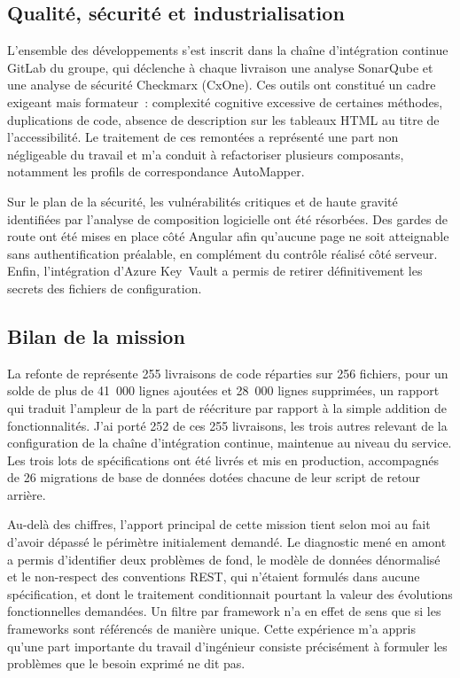 \subsection{Qualité, sécurité et industrialisation}
\label{sec:qualite}

L'ensemble des développements s'est inscrit dans la chaîne d'intégration
continue GitLab du groupe, qui déclenche à chaque livraison une analyse
SonarQube et une analyse de sécurité Checkmarx (CxOne). Ces outils ont
constitué un cadre exigeant mais formateur~: complexité cognitive excessive de
certaines méthodes, duplications de code, absence de description sur les
tableaux HTML au titre de l'accessibilité. Le traitement de ces remontées a
représenté une part non négligeable du travail et m'a conduit à refactoriser
plusieurs composants, notamment les profils de correspondance AutoMapper.

Sur le plan de la sécurité, les vulnérabilités critiques et de haute gravité
identifiées par l'analyse de composition logicielle ont été résorbées. Des
gardes de route ont été mises en place côté Angular afin qu'aucune page ne soit
atteignable sans authentification préalable, en complément du contrôle réalisé
côté serveur. Enfin, l'intégration d'Azure Key~Vault a permis de retirer
définitivement les secrets des fichiers de configuration.

\subsection{Bilan de la mission}
\label{sec:bilan-csbag}

La refonte de \csbag représente 255 livraisons de code réparties sur 256
fichiers, pour un solde de plus de 41~000 lignes ajoutées et 28~000 lignes
supprimées, un rapport qui traduit l'ampleur de la part de réécriture par
rapport à la simple addition de fonctionnalités. J'ai porté 252 de ces 255
livraisons, les trois autres relevant de la configuration de la chaîne
d'intégration continue, maintenue au niveau du service. Les trois lots de
spécifications ont été livrés et mis en production, accompagnés de 26 migrations
de base de données dotées chacune de leur script de retour arrière.

Au-delà des chiffres, l'apport principal de cette mission tient selon moi au
fait d'avoir dépassé le périmètre initialement demandé. Le diagnostic mené en
amont a permis d'identifier deux problèmes de fond, le modèle de données
dénormalisé et le non-respect des conventions REST, qui n'étaient formulés
dans aucune spécification, et dont le traitement conditionnait pourtant la
valeur des évolutions fonctionnelles demandées. Un filtre par framework n'a en
effet de sens que si les frameworks sont référencés de manière unique. Cette
expérience m'a appris qu'une part importante du travail d'ingénieur consiste
précisément à formuler les problèmes que le besoin exprimé ne dit pas.

